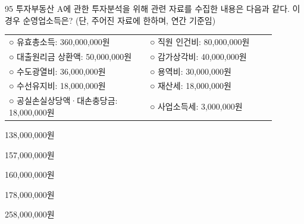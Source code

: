 \begin{question}{95}
투자부동산 A에 관한 투자분석을 위해 관련 자료를 수집한 내용은 다음과 같다. 이 경우 순영업소득은? (단, 주어진 자료에 한하며, 연간 기준임)
\begin{framedtext}
\begin{tabular}{@{}p{0.47\linewidth}p{0.42\linewidth}@{}}
○ 유효총소득: 360,000,000원 & ○ 직원 인건비: 80,000,000원 \\
○ 대출원리금 상환액: 50,000,000원 & ○ 감가상각비: 40,000,000원 \\
○ 수도광열비: 36,000,000원 & ○ 용역비: 30,000,000원 \\
○ 수선유지비: 18,000,000원 & ○ 재산세: 18,000,000원 \\
○ 공실손실상당액·대손충당금: 18,000,000원 & ○ 사업소득세: 3,000,000원 \\
\end{tabular}
\end{framedtext}
\begin{choices}
  \item 138,000,000원
  \item 157,000,000원
  \item 160,000,000원
  \item 178,000,000원
  \item 258,000,000원
\end{choices}
\end{question}
